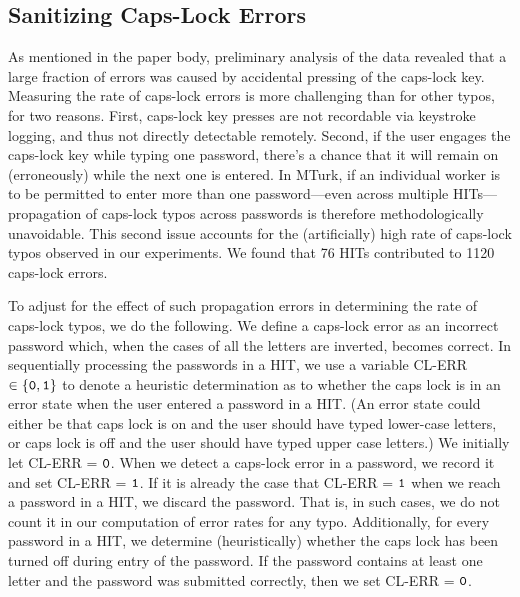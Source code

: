\subsection{Sanitizing Caps-Lock Errors}
\label{app:caps-lock-err}

As mentioned in the paper body, preliminary analysis of the data revealed that a large
fraction of errors was caused by accidental pressing of the caps-lock
key. Measuring the rate of caps-lock errors is more challenging than
for other typos, for two reasons. First, caps-lock key presses are not
recordable via keystroke logging, and thus not directly detectable
remotely.  Second, if the user engages the caps-lock key while typing
one password, there's a chance that it will remain on (erroneously)
while the next one is entered. In MTurk, if an individual worker is to
be permitted to enter more than one password---even across multiple
HITs---propagation of caps-lock typos across passwords is therefore
methodologically unavoidable. This second issue accounts for the
(artificially) high rate of caps-lock typos observed in our
experiments. We found that 76 HITs contributed to 1120 caps-lock
errors.

To adjust for the effect of such propagation errors in determining the rate of
caps-lock typos, we do the following. We define a caps-lock error as an
incorrect password which, when the cases of all the letters are
inverted, becomes correct. In sequentially processing the passwords in a HIT, we
use a variable {\sf CL-ERR} $\in \{{\tt 0}, {\tt 1}\}$ to denote a heuristic
determination as to whether the caps lock is in an error state 
when the user entered a password in a HIT. (An error state could either be that 
caps lock is on and the user should have typed lower-case letters, or caps lock is
off and the user should have typed upper case letters.) We initially let {\sf CL-ERR} =
${\tt 0}$. When we detect a caps-lock error in a password, we record it and
set {\sf CL-ERR} = ${\tt 1}$. If it is already the case that {\sf CL-ERR} =
${\tt 1}$ when we reach a password in a HIT, we discard the password. That is,
in such cases, we do not count it in our computation of error rates for any
typo. Additionally, for every password in a HIT, we determine (heuristically)
whether the caps lock has been turned off during entry of the password. If the
password contains at least one letter and the password was submitted correctly, 
then we set {\sf CL-ERR} = ${\tt 0}$. 

